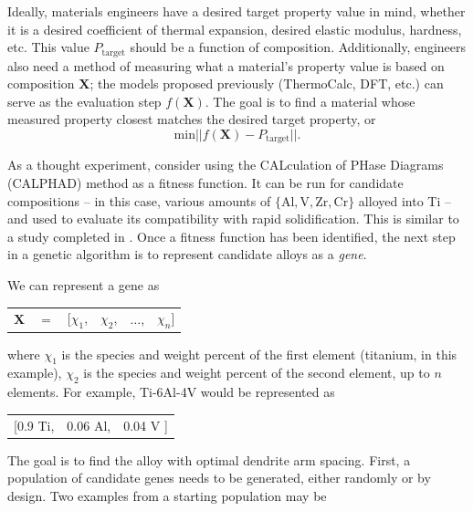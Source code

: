 Ideally, materials engineers have a desired target property value in mind, whether it is a desired coefficient of thermal expansion, desired elastic modulus, hardness, etc. This value $P_\text{target}$ should be a function of composition. Additionally, engineers also need a method of measuring what a material's property value is based on composition $\mathbf{X}$; the models proposed previously (ThermoCalc, DFT, etc.) can serve as the evaluation step $f(\mathbf{X})$. The goal is to find a material whose measured property closest matches the desired target property, or
\begin{equation}
	\text{min} || f(\mathbf{X}) - P_\text{target} ||.
	\label{GAopt}
\end{equation}

As a thought experiment, consider using the CALculation of PHase Diagrams (CALPHAD) method as a fitness function. It can be run for candidate compositions -- in this case, various amounts of $\{\text{Al}, \text{V}, \text{Zr}, \text{Cr}\}$ alloyed into Ti -- and used to evaluate its compatibility with rapid solidification. This is similar to a study completed in \cite{Li2017}. Once a fitness function has been identified, the next step in a genetic algorithm is to represent candidate alloys as a \textit{gene}. 

We can represent a gene as \\

\begin{table}[h!]
\begin{tabular}{cccccc}
	$\mathbf{X}$ & $=$ & [$\chi_1$, & $\chi_2$, & $\ldots$, & $\chi_n$] \\
\end{tabular}
\end{table}
\noindent 
where $\chi_1$ is the species and weight percent of the first element (titanium, in this example), $\chi_2$ is the species and weight percent of the second element, up to $n$ elements. For example, Ti-6Al-4V would be represented as \\

\begin{table}[h!]
\begin{tabular}{ccc}
	 [0.9 Ti,  & 0.06 Al, & 0.04 V ] \\
\end{tabular}
\end{table}
\noindent
The goal is to find the alloy with optimal dendrite arm spacing. First, a population of candidate genes needs to be generated, either randomly or by design. Two examples from a starting population may be \\

